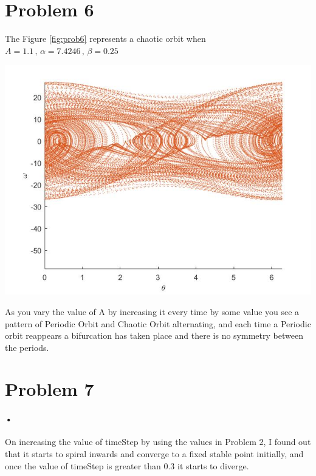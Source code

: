 \documentclass{article}
\begin{document}
\section*{Problem 6}
The Figure \ref{fig:prob6} represents a chaotic orbit when $A = 1.1 \,,\, \alpha = 7.4246 \,,\, \beta = 0.25$ \par\bigskip
\begin{minipage}{\linewidth}
{
\centering 
\includegraphics[scale=0.4]{images/prob6.jpg}
\label{fig:prob6}
}
\end{minipage}
\par\medskip
As you vary the value of A by increasing it every time by some value you see a pattern of Periodic Orbit and Chaotic Orbit alternating, and each time a Periodic orbit reappears a bifurcation has taken place and there is no symmetry between the periods.

\section*{Problem 7}
\paragraph*{•}
On increasing the value of timeStep by using the values in Problem 2, I found out that it starts to spiral inwards and converge to a fixed stable point initially, and once the value of timeStep is greater than 0.3 it starts to diverge. 
\end{document}
